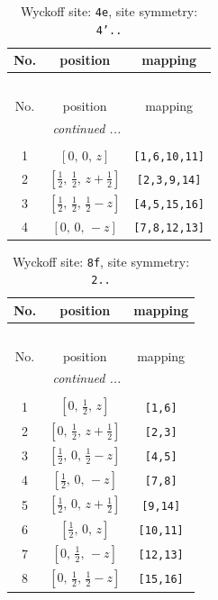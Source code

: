 \documentclass[fleqn,8pt]{jsarticle}
\begin{document}
\renewcommand{\arraystretch}{1.2}
\begin{longtable}{ccc}
\caption{Wyckoff site: {\tt 4e}, site symmetry: {\tt 4'..}}
 \\
 \hline \hline
No. & position & mapping \\ \hline \endfirsthead

\multicolumn{2}{l}{\tablename\ \thetable{}} \\
 \hline \hline
No. & position & mapping \\ \hline \endhead

 \hline \hline
\multicolumn{2}{r}{\footnotesize\it continued ...} \\ \endfoot

 \hline \hline
\multicolumn{2}{r}{} \\ \endlastfoot

1 & $\left[ 0,\, 0,\, z \right]$ & {\tt [1,6,10,11]} \\ \hline
2 & $\left[ \frac{1}{2},\, \frac{1}{2},\, z + \frac{1}{2} \right]$ & {\tt [2,3,9,14]} \\ \hline
3 & $\left[ \frac{1}{2},\, \frac{1}{2},\, \frac{1}{2} - z \right]$ & {\tt [4,5,15,16]} \\ \hline
4 & $\left[ 0,\, 0,\, - z \right]$ & {\tt [7,8,12,13]} \\
\end{longtable}
\renewcommand{\arraystretch}{1.2}
\begin{longtable}{ccc}
\caption{Wyckoff site: {\tt 8f}, site symmetry: {\tt 2..}}
 \\
 \hline \hline
No. & position & mapping \\ \hline \endfirsthead

\multicolumn{2}{l}{\tablename\ \thetable{}} \\
 \hline \hline
No. & position & mapping \\ \hline \endhead

 \hline \hline
\multicolumn{2}{r}{\footnotesize\it continued ...} \\ \endfoot

 \hline \hline
\multicolumn{2}{r}{} \\ \endlastfoot

1 & $\left[ 0,\, \frac{1}{2},\, z \right]$ & {\tt [1,6]} \\ \hline
2 & $\left[ 0,\, \frac{1}{2},\, z + \frac{1}{2} \right]$ & {\tt [2,3]} \\ \hline
3 & $\left[ \frac{1}{2},\, 0,\, \frac{1}{2} - z \right]$ & {\tt [4,5]} \\ \hline
4 & $\left[ \frac{1}{2},\, 0,\, - z \right]$ & {\tt [7,8]} \\ \hline
5 & $\left[ \frac{1}{2},\, 0,\, z + \frac{1}{2} \right]$ & {\tt [9,14]} \\ \hline
6 & $\left[ \frac{1}{2},\, 0,\, z \right]$ & {\tt [10,11]} \\ \hline
7 & $\left[ 0,\, \frac{1}{2},\, - z \right]$ & {\tt [12,13]} \\ \hline
8 & $\left[ 0,\, \frac{1}{2},\, \frac{1}{2} - z \right]$ & {\tt [15,16]} \\
\end{longtable}
\end{document}
